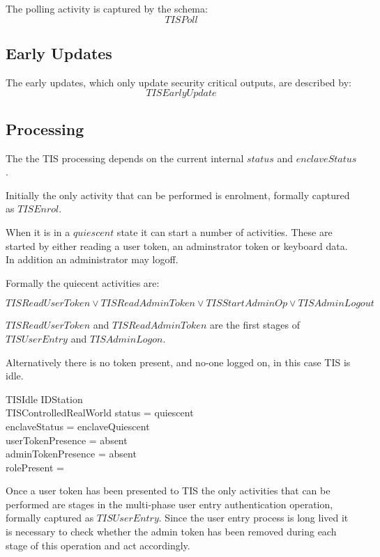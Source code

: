 The polling activity is captured by the schema:
\[
TISPoll
\]
\subsection{Early Updates}
The early updates, which only update security critical outputs, are
described by:
\[
TISEarlyUpdate
\]
\subsection{Processing}

The the TIS processing depends on the current internal $status$ and $enclaveStatus$. 

Initially the only activity that can be performed is enrolment,
formally captured as
$TISEnrol$.

When it is in a $quiescent$ state it can start a number of activities. These
are started by either reading a user token, an adminstrator token or
keyboard data. In addition an administrator may logoff.

Formally the quiecent activities are:

\[
        TISReadUserToken \lor TISReadAdminToken \lor TISStartAdminOp
\lor TISAdminLogout
\]
\begin{Zcomment}
\item
$TISReadUserToken$ and $TISReadAdminToken$ are the first stages of
$TISUserEntry$ and $TISAdminLogon$.
\end{Zcomment}
Alternatively there is no token present, and no-one logged on, in this
case TIS is idle.

\begin{schema}{TISIdle}
        \Xi IDStation
\\      \Xi TISControlledRealWorld
\where
        status = quiescent
\\      enclaveStatus = enclaveQuiescent
\\      userTokenPresence = absent
\\      adminTokenPresence = absent
\\      rolePresent = \Nil
\end{schema}

Once a user token has been presented to TIS the only activities
that can be performed are stages in the multi-phase user entry
authentication operation, formally captured as $TISUserEntry$. Since
the user entry process is long lived it is necessary to check whether
the admin token has been removed during each stage of this operation
and act accordingly.

